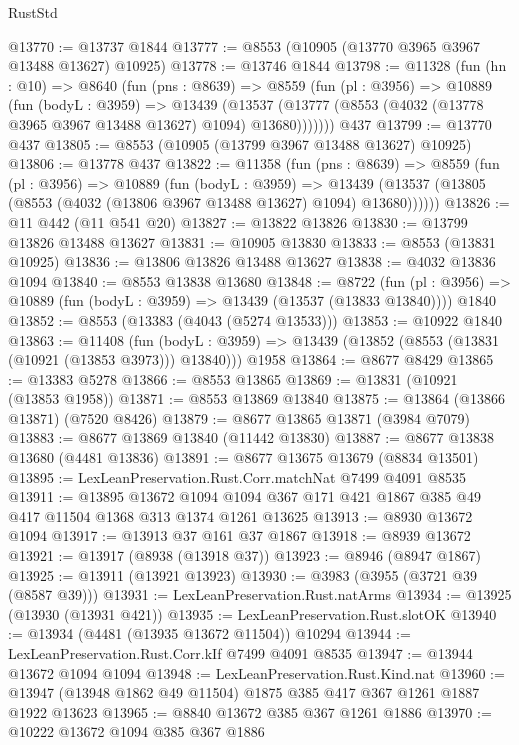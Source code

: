 \begin{lexlean}{RustStd}
\begin{coremodule}
@13770 := @13737 @1844
@13777 := @8553 (@10905 (@13770 @3965 @3967 @13488 @13627) @10925)
@13778 := @13746 @1844
@13798 := @11328
    (fun (hn : @10) =>
    @8640
      (fun (pns : @8639) =>
      @8559
        (fun (pl : @3956) =>
        @10889
          (fun (bodyL : @3959) =>
          @13439
            (@13537 (@13777 (@8553 (@4032 (@13778 @3965 @3967 @13488 @13627) @1094) @13680)))))))
    @437
@13799 := @13770 @437
@13805 := @8553 (@10905 (@13799 @3967 @13488 @13627) @10925)
@13806 := @13778 @437
@13822 := @11358
    (fun (pns : @8639) =>
    @8559
      (fun (pl : @3956) =>
      @10889
        (fun (bodyL : @3959) =>
        @13439 (@13537 (@13805 (@8553 (@4032 (@13806 @3967 @13488 @13627) @1094) @13680))))))
@13826 := @11 @442 (@11 @541 @20)
@13827 := @13822 @13826
@13830 := @13799 @13826 @13488 @13627
@13831 := @10905 @13830
@13833 := @8553 (@13831 @10925)
@13836 := @13806 @13826 @13488 @13627
@13838 := @4032 @13836 @1094
@13840 := @8553 @13838 @13680
@13848 := @8722
    (fun (pl : @3956) => @10889 (fun (bodyL : @3959) => @13439 (@13537 (@13833 @13840))))
    @1840
@13852 := @8553 (@13383 (@4043 (@5274 @13533)))
@13853 := @10922 @1840
@13863 := @11408
    (fun (bodyL : @3959) => @13439 (@13852 (@8553 (@13831 (@10921 (@13853 @3973))) @13840)))
    @1958
@13864 := @8677 @8429
@13865 := @13383 @5278
@13866 := @8553 @13865
@13869 := @13831 (@10921 (@13853 @1958))
@13871 := @8553 @13869 @13840
@13875 := @13864 (@13866 @13871) (@7520 @8426)
@13879 := @8677 @13865 @13871 (@3984 @7079)
@13883 := @8677 @13869 @13840 (@11442 @13830)
@13887 := @8677 @13838 @13680 (@4481 @13836)
@13891 := @8677 @13675 @13679 (@8834 @13501)
@13895 := LexLeanPreservation.Rust.Corr.matchNat @7499 @4091 @8535
@13911 := @13895
    @13672
    @1094
    @1094
    @367
    @171
    @421
    @1867
    @385
    @49
    @417
    @11504
    @1368
    @313
    @1374
    @1261
    @13625
@13913 := @8930 @13672 @1094
@13917 := @13913 @37 @161 @37 @1867
@13918 := @8939 @13672
@13921 := @13917 (@8938 (@13918 @37))
@13923 := @8946 (@8947 @1867)
@13925 := @13911 (@13921 @13923)
@13930 := @3983 (@3955 (@3721 @39 (@8587 @39)))
@13931 := LexLeanPreservation.Rust.natArms
@13934 := @13925 (@13930 (@13931 @421))
@13935 := LexLeanPreservation.Rust.slotOK
@13940 := @13934 (@4481 (@13935 @13672 @11504)) @10294
@13944 := LexLeanPreservation.Rust.Corr.kIf @7499 @4091 @8535
@13947 := @13944 @13672 @1094 @1094
@13948 := LexLeanPreservation.Rust.Kind.nat
@13960 := @13947 (@13948 @1862 @49 @11504) @1875 @385 @417 @367 @1261 @1887 @1922 @13623
@13965 := @8840 @13672 @385 @367 @1261 @1886
@13970 := @10222 @13672 @1094 @385 @367 @1886

\end{coremodule}
\end{lexlean}
